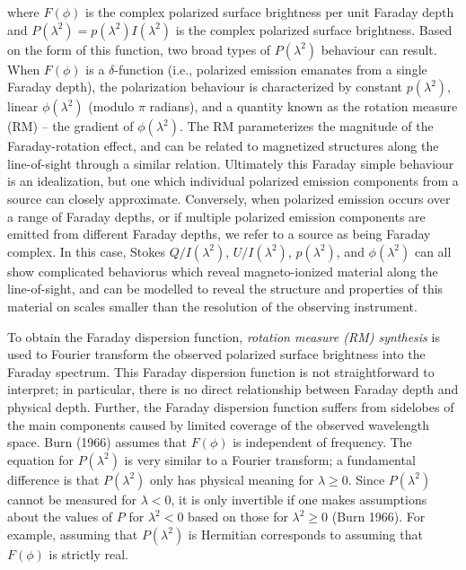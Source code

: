 \documentclass[a4paper,10pt]{article}
\begin{document}
{\noindent}where $F(\phi)$ is the complex polarized surface brightness per unit Faraday depth and $P(\lambda^2) = p(\lambda^2)I(\lambda^2)$ is the complex polarized surface brightness. Based on the form of this function, two broad types of $P(\lambda^2)$ behaviour can result. When $F(\phi)$ is a $\delta$-function (i.e., polarized emission emanates from a single Faraday depth), the polarization behaviour is characterized by constant $p(\lambda^2)$, linear $\phi(\lambda^2)$ (modulo $\pi$ radians), and a quantity known as the rotation measure (RM) -- the gradient of $\phi(\lambda^2)$. The RM parameterizes the magnitude of the Faraday-rotation effect, and can be related to magnetized structures along the line-of-sight through a similar relation. Ultimately this Faraday simple behaviour is an idealization, but one which individual polarized emission components from a source can closely approximate. Conversely, when polarized emission occurs over a range of Faraday depths, or if multiple polarized emission components are emitted from different Faraday depths, we refer to a source as being Faraday complex. In this case, Stokes $Q/I(\lambda^2)$, $U/I(\lambda^2)$, $p(\lambda^2)$, and $\phi(\lambda^2)$ can all show complicated behaviorus which reveal magneto-ionized material along the line-of-sight, and can be modelled to reveal the structure and properties of this material on scales smaller than the resolution of the observing instrument.

{\noindent}To obtain the Faraday dispersion function, \textit{rotation measure (RM) synthesis} is used to Fourier transform the observed polarized surface brightness into the Faraday spectrum. This Faraday dispersion function is not straightforward to interpret; in particular, there is no direct relationship between Faraday depth and physical depth. Further, the Faraday dispersion function suffers from sidelobes of the main components caused by limited coverage of the observed wavelength space. Burn (1966) assumes that $F(\phi)$ is independent of frequency. The equation for $P(\lambda^2)$ is very similar to a Fourier transform; a fundamental difference is that $P(\lambda^2)$ only has physical meaning for $\lambda\geq0$. Since $P(\lambda^2)$ cannot be measured for $\lambda<0$, it is only invertible if one makes assumptions about the values of $P$ for $\lambda^2<0$ based on those for $\lambda^2\geq0$ (Burn 1966). For example, assuming that $P(\lambda^2)$ is Hermitian corresponds to assuming that $F(\phi)$ is strictly real.
\end{document}
